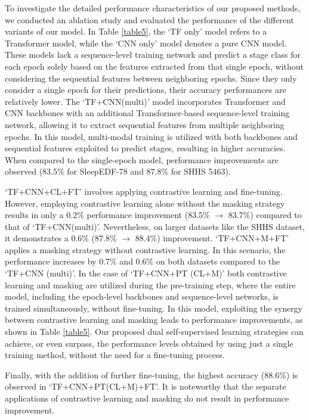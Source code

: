To investigate the detailed performance characteristics of our proposed methods, we conducted an ablation study and evaluated the performance of the different variants of our model. 
%
In Table \ref{table5}, the `TF only' model refers to a Transformer model, while the `CNN only' model denotes a pure CNN model. These models lack a sequence-level training network and predict a stage class for each epoch solely based on the features extracted from that single epoch, without considering the sequential features between neighboring epochs.
%
Since they only consider a single epoch for their predictions, their accuracy performances are relatively lower. The `TF+CNN(multi)' model incorporates Transformer and CNN backbones with an additional Transformer-based sequence-level training network, allowing it to extract sequential features from multiple neighboring epochs.
%
In this model, multi-modal training is utilized with both backbones and sequential features exploited to predict stages, resulting in higher accuracies. When compared to the single-epoch model, performance improvements are observed (83.5\% for SleepEDF-78 and 87.8\% for SHHS 5463).

`TF+CNN+CL+FT' involves applying contrastive learning and fine-tuning. However, employing contrastive learning alone without the masking strategy results in only a 0.2\% performance improvement (83.5\% $\rightarrow$ 83.7\%) compared to that of `TF+CNN(multi)'. Nevertheless, on larger datasets like the SHHS dataset, it demonstrates a 0.6\% (87.8\% $\rightarrow$ 88.4\%) improvement.
%
`TF+CNN+M+FT' applies a masking strategy without contrastive learning. In this scenario, the performance increases by 0.7\% and 0.6\% on both datasets compared to the `TF+CNN (multi)'.
%
In the case of `TF+CNN+PT (CL+M)' both contrastive learning and masking are utilized during the pre-training step, where the entire model, including the epoch-level backbones and sequence-level networks, is trained simultaneously, without fine-tuning.
%
In this model, exploiting the synergy between contrastive learning and masking leads to performance improvements, as shown in Table \ref{table5}. 
%
Our proposed dual self-supervised learning strategies can achieve, or even surpass, the performance levels obtained by using just a single training method, without the need for a fine-tuning process.

Finally, with the addition of further fine-tuning, the highest accuracy (88.6\%) is observed in `TF+CNN+PT(CL+M)+FT'. It is noteworthy that the separate applications of contrastive learning and masking do not result in performance improvement.


